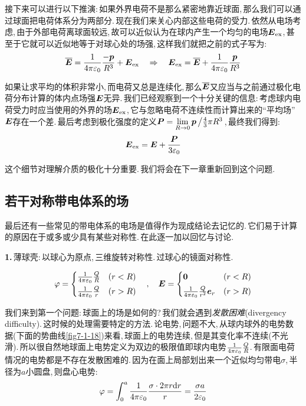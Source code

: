 接下来可以进行以下推演:\,如果外界电荷不是那么紧密地靠近球面,\,那么我们可以通过球面把电荷体系分为两部分.\,现在我们来关心内部这些电荷的受力.\,依然从电场考虑,\,由于外部电荷离球面较远,\,故可以近似认为在球内产生一个均匀的电场$\boldsymbol{E}_{\rm ex}$,\,甚至于它就可以近似地等于对球心处的场强,\,这样我们就把之前的式子写为:
\[\overline{\boldsymbol{E}}=\frac{1}{4\pi\varepsilon_0} \frac{-\boldsymbol{p}}{R^3}+\boldsymbol{E}_{\rm ex} \quad\Rightarrow \quad \boldsymbol{E}_{\rm ex}=\overline{\boldsymbol{E}}+\frac{1}{4\pi\varepsilon_0} \frac{\boldsymbol{p}}{R^3}\]

如果让求平均的体积非常小,\,而电荷又总是连续化,\,那么$\overline{\boldsymbol{E}}$又应当与之前通过极化电荷分布计算的体内点场强$\boldsymbol{E}$无异.\,我们已经观察到一个十分关键的信息:\,考虑球内电荷受力时应当使用的外界的场$\boldsymbol{E}_{\rm ex}$,\,它与忽略电荷不连续性而计算出来的``平均场''$\boldsymbol{E}$存在一个差.\,最后考虑到极化强度的定义$\boldsymbol{P}=\lim\limits_{R\to 0}\boldsymbol{p}\left/\frac{4}{3}\pi R^3\right.$,\,最终我们得到:
\[\boldsymbol{E}_{\rm ex}=\boldsymbol{E}+\frac{\boldsymbol{P}}{3\varepsilon_0}\]

这个细节对理解介质的极化十分重要.\,我们将会在下一章重新回到这个问题.

\subsection{若干对称带电体系的场}

最后还有一些常见的带电体系的电场是值得作为现成结论去记忆的.\,它们易于计算的原因在于或多或少具有某些对称性.\,在此逐一加以回忆与讨论.

\vspace{0.3cm}
\textbf{1.}\,薄球壳:\,以球心为原点,\,三维旋转对称性.\,过球心的镜面对称性.

\[\varphi=\begin{cases} \frac{1}{4\pi\varepsilon_0} \frac{Q}{R}& (r<R) \\[3pt] \frac{1}{4\pi\varepsilon_0} \frac{Q}{r} & (r>R) \end{cases} \quad,	\quad \boldsymbol{E}=\begin{cases}  \boldsymbol{0} & (r<R) \\[3pt] \frac{1}{4\pi\varepsilon_0} \frac{Q}{r^2}\boldsymbol{e}_r & (r>R) \end{cases}\]

我们来到第一个问题:\,球面上的场是如何的?\,我们就会遇到\emph{发散困难}(divergency difficulty).\,这时候的处理需要特定的方法.\,论电势,\,问题不大,\,从球内球外的电势数据(下面的势曲线\ref{fig7-1-18})来看,\,球面上的电势连续,\,但是其变化率不连续(不光滑).\,所以很自然地球面上电势定义为双边的极限值即球内电势$\frac{1}{4\pi\varepsilon_0} \frac{Q}{R}$.\,有限面电荷情况的电势都是不存在发散困难的.\,因为在面上局部划出来一个近似均匀带电$\sigma$,\,半径为$a$小圆盘,\,则盘心电势:
\[\varphi=\int_0^a \frac{1}{4\pi\varepsilon_0} \frac{\sigma \cdot 2\pi r \textrm{d} r}{r}=\frac{\sigma a}{2\varepsilon_0}\]

